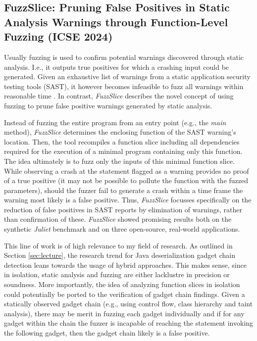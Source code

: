 \documentclass[11pt]{article}
\begin{document}
\subsection{FuzzSlice: Pruning False Positives in Static Analysis Warnings through Function-Level Fuzzing (ICSE 2024) \cite{fuzzslice}}

Usually fuzzing is used to confirm potential warnings discovered through static analysis. I.e., it outputs true positives for which a crashing input could be generated. Given an exhaustive list of warnings from a static application security testing tools (SAST), it however becomes infeasible to fuzz all warnings within reasonable time \cite{fuzzing2020}. In contrast, \textit{FuzzSlice} \cite{fuzzslice} describes the novel concept of using fuzzing to prune false positive warnings generated by static analysis. 

Instead of fuzzing the entire program from an entry point (e.g., the \textit{main} method), \textit{FuzzSlice} determines the enclosing function of the SAST warning's location. Then, the tool recompiles a function slice including all dependencies required for the execution of a minimal program containing only this function. The idea ultimately is to fuzz only the inputs of this minimal function slice. While observing a crash at the statement flagged as a warning provides no proof of a true positive (it may not be possible to pollute the function with the fuzzed parameters), should the fuzzer fail to generate a crash within a time frame the warning most likely is a false positive. Thus, \textit{FuzzSlice} focusses specifically on the reduction of false positives in SAST reports by elimination of warnings, rather than confirmation of these. \textit{FuzzSlice} showed promising results both on the synthetic \textit{Juliet} benchmark and on three open-source, real-world applications.

This line of work is of high relevance to my field of research. As outlined in Section \ref{sec:lecture}, the research trend for Java deserialization gadget chain detection leans towards the usage of hybrid approaches. This makes sense, since in isolation, static analysis and fuzzing are either lacklustre in precision or soundness. More importantly, the idea of analyzing function slices in isolation could potentially be ported to the verification of gadget chain findings. Given a statically observed gadget chain (e.g., using control flow,  class hierarchy and taint analysis), there may be merit in fuzzing each gadget individually and if for any gadget within the chain the fuzzer is incapable of reaching the statement invoking the following gadget, then the gadget chain likely is a false positive. 
\end{document}
